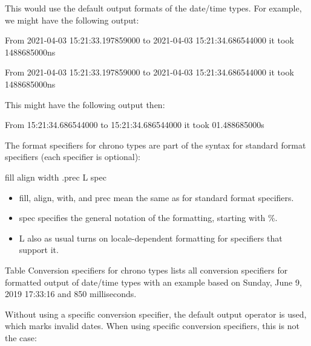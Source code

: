 This would use the default output formats of the date/time types. For example, we might have the following output:

\begin{shell}
From 2021-04-03 15:21:33.197859000 to 2021-04-03 15:21:34.686544000
it took 1488685000ns
\end{shell}

From 2021-04-03 15:21:33.197859000 to 2021-04-03 15:21:34.686544000 it took 1488685000ns


This might have the following output then:

\begin{shell}
From 15:21:34.686544000 to 15:21:34.686544000 it took 01.488685000s
\end{shell}

The format specifiers for chrono types are part of the syntax for standard format specifiers (each specifier is optional):

\begin{shell}
fill align width .prec L spec
\end{shell}

\begin{itemize}
\item 
fill, align, with, and prec mean the same as for standard format specifiers.

\item 
spec specifies the general notation of the formatting, starting with \%.

\item 
L also as usual turns on locale-dependent formatting for specifiers that support it.
\end{itemize}

Table Conversion specifiers for chrono types lists all conversion specifiers for formatted output of date/time types with an example based on Sunday, June 9, 2019 17:33:16 and 850 milliseconds.

Without using a specific conversion specifier, the default output operator is used, which marks invalid dates. When using specific conversion specifiers, this is not the case:


